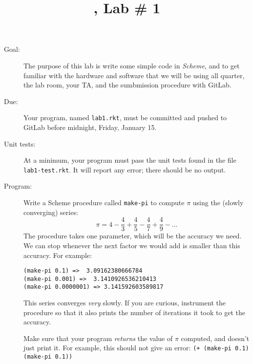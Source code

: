 \documentclass{article}
\title{\course, Lab \# 1}
\author{\term}
\date{}
\begin{document}
\maketitle

\begin{multicols}{2}
  
\begin{description}
\item[Goal:] The purpose of this lab is write some simple code in {\em
  Scheme}, and to get familiar with the hardware and software that we
  will be using all quarter, the lab room, your TA, and the
  sumbmission procedure with GitLab.

\item[Due:] Your program, named {\tt lab1.rkt}, must be committed and pushed to
  GitLab before midnight, Friday, January 15.

\item[Unit tests:] At a minimum, your program must pass the unit tests found in
  the file {\tt lab1-test.rkt}.  It will report any error; there should be no
  output.

\item[Program:] Write a {\sc Scheme} procedure called {\tt make-pi} to compute
  $\pi$ using the (slowly converging) series:
  \[
    {\pi} = 4 - \frac43 + \frac45 - \frac47 + \frac49 - \ldots
  \]
  The procedure takes one parameter, which will be the accuracy we need.  We can
  stop whenever the next factor we would add is smaller than this accuracy.  For
  example:
\begin{Verbatim}[frame=single]
(make-pi 0.1) =>  3.09162380666784
(make-pi 0.001) =>  3.1410926536210413
(make-pi 0.0000001) => 3.141592603589817
\end{Verbatim}
  This series converges {\em very} slowly.  If you are curious, instrument the
  procedure so that it also prints the number of iterations it took to get the
  accuracy.

  Make sure that your program {\em returns} the value of $\pi$ computed, and
  doesn't just print it.  For example, this should not give an error:
  \verb|(+ (make-pi 0.1) (make-pi 0.1))|



\end{description}
\end{multicols}
\end{document}
